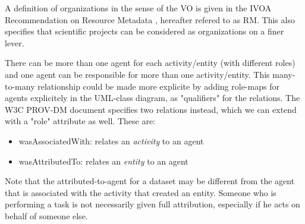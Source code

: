\documentclass[11pt,a4paper]{ivoa}
\begin{document}
A definition of organizations in the sense of the VO is given in the IVOA Recommendation on Resource Metadata \citep{std:ResourceMeta}, hereafter refered to as RM. This also specifies that scientific projects can be considered as organizations on a finer lever.

There can be more than one agent for each activity/entity (with different roles) and one agent can be responsible for more than one activity/entity. This many-to-many relationship could be made more explicite by adding role-maps for agents explicitely in the UML-class diagram, as "qualifiers" for the relations. The W3C PROV-DM document specifies two relations instead, which we can extend with a "role" attribute as well. These are:

\begin{itemize}
\item wasAssociatedWith: relates an \emph{activity} to an agent
\item wasAttributedTo: relates an \emph{entity} to an agent
\end{itemize}

Note that the attributed-to-agent for a dataset may be different from the agent that is associated with the activity that created an entity. Someone who is performing a task is not necessarily given full attribution, especially if he acts on behalf of someone else.
\end{document}
